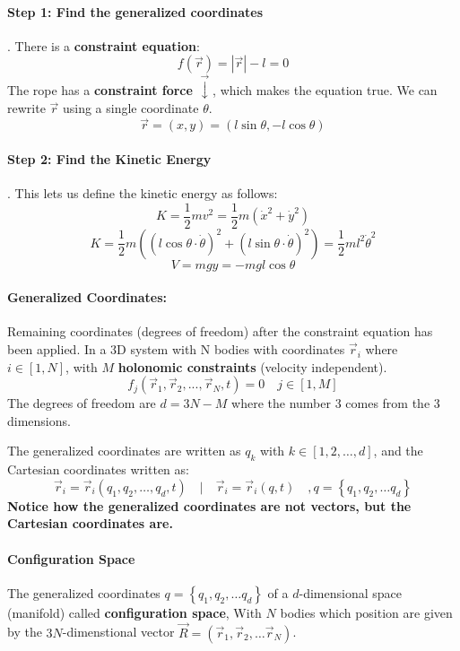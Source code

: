 \paragraph{Step 1: Find the generalized coordinates}
.\newline
There is a \textbf{constraint equation}:
\[
f(\vec{r}) = \left|\vec{r}\right| - l = 0
\]
The rope has a \textbf{constraint force} $\vec{↓}$, which makes the equation true. We can rewrite $\vec{r}$ using a single coordinate $θ$. 
\[
\vec{r}  = (x,y) = (l \sin \theta, -l \cos \theta)
\]
\paragraph{Step 2: Find the Kinetic Energy}
.\newline
This lets us define the kinetic energy as follows:
\[
K = \frac{1}{2}mv^2 = \frac{1}{2}m(\dot{x} ^2 + \dot{y}^2)
\]
\[
K = \frac{1}{2}m \left((l\cos θ ⋅ \dot{θ})^2 + (l\sin θ ⋅ \dot{θ})^2\right) = \frac{1}{2}ml^2 \dot{θ}^2
\]
\[
V = mgy = -mgl \cos θ
\]

\paragraph{Generalized Coordinates:}
Remaining coordinates (degrees of freedom) after the constraint equation has been applied. In a 3D system with N bodies with coordinates $\vec{r}_i$ where $i ∈ [1,N]$, with $M$ \textbf{holonomic constraints} (velocity independent). 
\[
f_j(\vec{r}_1, \vec{r}_2, ..., \vec{r}_N, t) = 0 \quad j ∈ [1,M]
\]
The degrees of freedom are $d = 3N - M$ where the number 3 comes from the 3 dimensions. 

The generalized coordinates are written as $q_k$ with $k ∈ [1,2, \ldots ,d]$, and the Cartesian coordinates written as:
\[
\vec{r}_i = \vec{r}_i(q_1, q_2, \ldots , q_d, t) \quad | \quad \vec{r}_i = \vec{r}_i(q,t) \quad , q = \left\{q_1, q_2, \ldots  q_d\right\}
\]
\textbf{Notice how the generalized coordinates are not vectors, but the Cartesian coordinates are.}

\paragraph{Configuration Space}
The generalized coordinates $q = \left\{q_1, q_2, \ldots  q_d\right\}$ of a $d$-dimensional space (manifold) called \textbf{configuration space}, With $N$ bodies which position are given by the $3N$-dimenstional vector $\vec{R}= (\vec{r}_1, \vec{r}_2, \ldots  \vec{r}_{N})$. 

